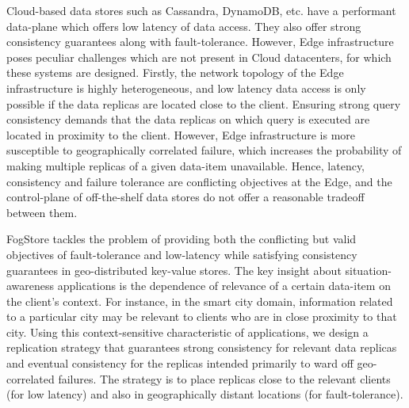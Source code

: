 \par Cloud-based data stores such as Cassandra, DynamoDB, etc. have a performant data-plane which offers low latency of data access. They also offer strong consistency guarantees along with fault-tolerance. However, Edge infrastructure poses peculiar challenges which are not present in Cloud datacenters, for which these systems are designed. Firstly, the network topology of the Edge infrastructure is highly heterogeneous, and low latency data access is only possible if the data replicas are located close to the client. Ensuring strong query consistency demands that the data replicas on which query is executed are located in proximity to the client. However, Edge infrastructure is more susceptible to geographically correlated failure, which increases the probability of making multiple replicas of a given data-item unavailable. Hence, latency, consistency and failure tolerance are conflicting objectives at the Edge, and the control-plane of off-the-shelf data stores do not offer a reasonable tradeoff between them. 
\par FogStore tackles the problem of providing both the conflicting but valid objectives of fault-tolerance and low-latency while satisfying consistency guarantees in geo-distributed key-value stores. The key insight about situation-awareness applications is the dependence of relevance of a certain data-item on the client's context. For instance, in the smart city domain, information related to a particular city may be relevant to clients who are in close proximity to that city. Using this context-sensitive characteristic of applications, we design a replication strategy that guarantees strong consistency for relevant data replicas and eventual consistency for the replicas intended primarily to ward off geo-correlated failures.  
The strategy is to place replicas close to the relevant clients (for low latency) and also in geographically distant locations (for fault-tolerance).

